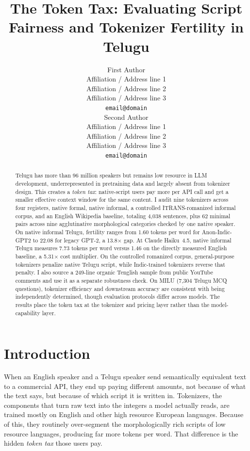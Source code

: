 ﻿\documentclass[11pt]{article}
\title{The Token Tax: Evaluating Script Fairness and Tokenizer Fertility in Telugu}
\author{First Author \\
  Affiliation / Address line 1 \\
  Affiliation / Address line 2 \\
  Affiliation / Address line 3 \\
  \texttt{email@domain} \\\And
  Second Author \\
  Affiliation / Address line 1 \\
  Affiliation / Address line 2 \\
  Affiliation / Address line 3 \\
  \texttt{email@domain} \\}
\begin{document}
\maketitle
\begin{abstract}
Telugu has more than 96 million speakers but remains low resource in
LLM development, underrepresented in pretraining data and largely
absent from tokenizer design. This creates a \textit{token tax}:
native-script users pay more per API call and get a smaller effective
context window for the same content. I audit nine tokenizers across
four registers, native formal, native informal, a controlled
ITRANS-romanized informal corpus, and an English Wikipedia baseline,
totaling 4,038 sentences, plus 62 minimal pairs across nine
agglutinative morphological categories checked by one native speaker.
On native informal Telugu, fertility ranges from 1.60 tokens per word
for Anon-Indic-GPT2 to 22.08 for legacy GPT-2, a 13.8$\times$ gap.
At Claude Haiku~4.5, native informal Telugu measures 7.73 tokens per
word versus 1.46 on the directly measured English baseline, a
5.31$\times$ cost multiplier. On the controlled romanized corpus,
general-purpose tokenizers penalize native Telugu script, while
Indic-trained tokenizers reverse that penalty. I also source a 249-line organic Tenglish sample from public YouTube comments and use it as a separate robustness check. On MILU
\citep{verma-etal-2024-milu} (7,304 Telugu MCQ questions), tokenizer
efficiency and downstream accuracy are consistent with being
independently determined, though evaluation protocols differ across
models. The results place the token tax at the tokenizer and pricing
layer rather than the model-capability layer.
\end{abstract}

\section{Introduction}
When an English speaker and a Telugu speaker send semantically
equivalent text to a commercial API, they end up paying different
amounts, not because of what the text says, but because of which
script it is written in. Tokenizers, the components that turn raw
text into the integers a model actually reads, are trained mostly on
English and other high resource European languages. Because of this,
they routinely over-segment the morphologically rich scripts of low
resource languages, producing far more tokens per word. That
difference is the hidden \textit{token tax} those users pay.
\end{document}
